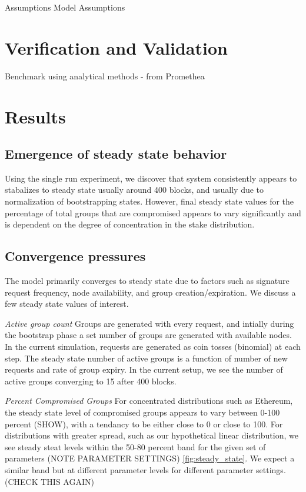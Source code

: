 \documentclass[conference]{IEEEtran}
\begin{document}
Assumptions
Model Assumptions
    
\section{Verification and Validation}
Benchmark using analytical methods - from Promethea

\section{Results}
\subsection{Emergence of steady state behavior}
Using the single run experiment, we discover that system consistently appears to 
stabalizes to steady state usually around 400 blocks, and usually due to normalization of bootstrapping states. 
However, final steady state values for the percentage of total groups that are compromised
appears to vary significantly and is dependent on the degree of concentration in the 
stake distribution. 

\subsection{Convergence pressures}

The model primarily converges to steady state due to factors such as
signature request frequency, node availability, and group creation/expiration. We discuss a few
steady state values of interest.

\textit{Active group count} Groups are generated with every request, and intially
during the bootstrap phase a set number of groups are generated with available nodes. In the current
simulation, requests are generated as coin tosses (binomial) at each step. The steady state number of 
active groups is a function of number of new requests and rate of group expiry. In the current setup, 
we see the number of active groups converging to 15 after 400 blocks.

\textit{Percent Compromised Groups} For concentrated distributions such as Ethereum, the steady state level of compromised
groups appears to vary between 0-100 percent (SHOW), with a tendancy to be either close
to 0 or close to 100. For distributions with greater spread, such as our hypothetical linear
distribution, we see steady steat levels within the 50-80 percent band for the given set
of parameters (NOTE PARAMETER SETTINGS) \ref{fig:steady_state}. We expect a similar band but at
different parameter levels for different parameter settings. (CHECK THIS AGAIN)
\end{document}
